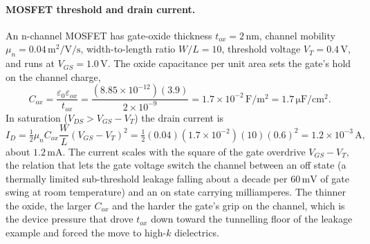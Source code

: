 

\paragraph{MOSFET threshold and drain current.}
An n-channel MOSFET has gate-oxide thickness $t_{ox} = 2\,\si{\nano
\meter}$, channel mobility $\mu_{n} = 0.04\,\si{\meter\squared\per\volt
\per\second}$, width-to-length ratio $W/L = 10$, threshold voltage
$V_{T} = 0.4\,\si{\volt}$, and runs at $V_{GS} = 1.0\,\si{\volt}$. The
oxide capacitance per unit area sets the gate's hold on the channel
charge,
\[
C_{ox} = \frac{\varepsilon_{0}\varepsilon_{ox}}{t_{ox}}
= \frac{(8.85\times 10^{-12})(3.9)}{2\times 10^{-9}}
= 1.7\times 10^{-2}\,\si{\farad\per\meter\squared}
= 1.7\,\si{\micro\farad\per\centi\meter\squared}.
\]
In saturation ($V_{DS} > V_{GS} - V_{T}$) the drain current is
\[
I_{D} = \tfrac{1}{2}\mu_{n}C_{ox}\frac{W}{L}(V_{GS} - V_{T})^{2}
= \tfrac{1}{2}(0.04)(1.7\times 10^{-2})(10)(0.6)^{2}
= 1.2\times 10^{-3}\,\si{\ampere},
\]
about $1.2\,\si{\milli\ampere}$. The current scales with the square of
the gate overdrive $V_{GS} - V_{T}$, the relation that lets the gate
voltage switch the channel between an off state (a thermally limited
sub-threshold leakage falling about a decade per $60\,\si{\milli\volt}$
of gate swing at room temperature) and an on state carrying milliamperes.
The thinner the oxide, the larger $C_{ox}$ and the harder the gate's
grip on the channel, which is the device pressure that drove $t_{ox}$
down toward the tunnelling floor of the leakage example and forced the
move to high-$k$ dielectrics.

